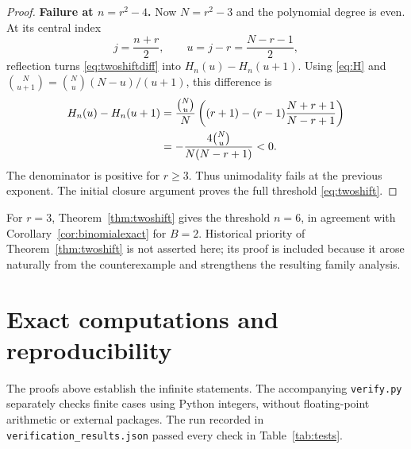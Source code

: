 \documentclass[11pt]{article}
\theoremstyle{research}
\theoremstyle{definition}
\numberwithin{equation}{section}
\begin{document}
\begin{proof}
\medskip\noindent\textbf{Failure at $n=r^2-4$.}
Now $N=r^2-3$ and the polynomial degree is even.
At its central index
\[
 j=\frac{n+r}{2},\qquad u=j-r=\frac{N-r-1}{2},
\]
reflection turns \eqref{eq:twoshiftdiff} into $H_n(u)-H_n(u+1)$.
Using \eqref{eq:H} and
$\binom N{u+1}=\binom Nu(N-u)/(u+1)$, this difference is
\begin{align}
 H_n(u)-H_n(u+1)
 &=\frac{\binom Nu}{N}
   \left((r+1)-(r-1)\frac{N+r+1}{N-r+1}\right)\notag\\
 &=-\frac{4\binom Nu}{N(N-r+1)}<0.\label{eq:centralnegative}
\end{align}
The denominator is positive for $r\ge3$.
Thus unimodality fails at the previous exponent. The initial closure
argument proves the full threshold \eqref{eq:twoshift}.
\end{proof}

For $r=3$, Theorem~\ref{thm:twoshift} gives the threshold $n=6$,
in agreement with Corollary~\ref{cor:binomialexact} for $B=2$.
Historical priority of Theorem~\ref{thm:twoshift} is not asserted here;
its proof is included because it arose naturally from the counterexample
and strengthens the resulting family analysis.

\section{Exact computations and reproducibility}
\label{sec:verification}
The proofs above establish the infinite statements. The accompanying
\texttt{verify.py} separately checks finite cases using Python integers,
without floating-point arithmetic or external packages.
The run recorded in \texttt{verification\_results.json} passed every
check in Table~\ref{tab:tests}.
\end{document}
